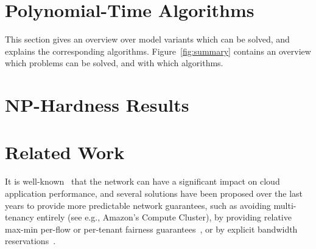 \documentclass[9pt,twocolumn]{scrartcl}
\begin{document}



\section{Polynomial-Time Algorithms}\label{sec:poly}

This section gives an overview over model variants which can be solved, and
explains the corresponding algorithms. Figure~\ref{fig:summary} contains an
overview which problems can be solved, and with which algorithms.







\section{NP-Hardness Results}\label{sec:np}




\section{Related Work}\label{sec:relwork}

It is well-known~\cite{talk-about} that the network
can have a significant impact on cloud application
performance, and several solutions have been proposed
over the last years to provide more predictable
network guarantees, such as avoiding multi-tenancy
entirely (see e.g., Amazon's Compute Cluster), by providing relative max-min
per-flow or per-tenant fairness
guarantees~\cite{seawall,netshare,faircloud,elasticswitch}, or by
explicit bandwidth
reservations~\cite{gatekeeper,secondnet,oktopus, proteus, drl}.
\end{document}
